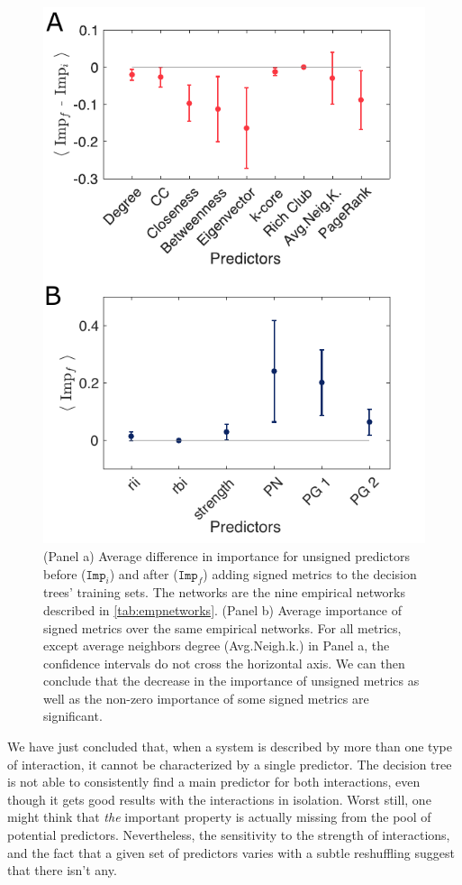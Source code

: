 \begin{figure}
    \centering
    \includegraphics[width=.7\textwidth]{figures/chp2/fig_1415.pdf}
    \caption[ \, Differences on the importance for unsigned and signed predictors]{(Panel a) Average difference in importance for unsigned predictors before ($\texttt{Imp}_i$) and after  ($\texttt{Imp}_f$) adding signed metrics to the decision trees' training sets. The networks are the nine empirical networks described in \ref{tab:empnetworks}. (Panel b) Average importance of signed metrics over the same empirical networks. For all metrics, except average neighbors degree (Avg.Neigh.k.) in Panel a, the confidence intervals do not cross the horizontal axis. We can then conclude that the decrease in the importance of unsigned metrics as well as the non-zero importance of some signed metrics are significant.}
    \label{chp2:fig:1415}
\end{figure}

 We have just concluded that, when a system is described by more than one type of interaction, it cannot be characterized by a single predictor. The decision tree is not able to consistently find a main predictor for both interactions, even though it gets good results with the interactions in isolation. Worst still, one might think that \textit{the} important property is actually missing from the pool of potential predictors. Nevertheless, the sensitivity to the strength of interactions, and the fact that a given set of predictors varies with a subtle reshuffling suggest that there isn't any. \\

